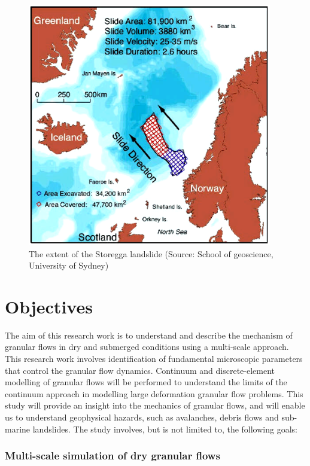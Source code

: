 \begin{figure}[htpb]
\centering
\includegraphics[width=0.95\textwidth]{Storegga}
\caption[The extent of the Storegga landslide]{The extent of the Storegga 
landslide (Source: School of geoscience, University of Sydney)}
\label{fig:Landslide}
\end{figure}

\section{Objectives}
The aim of this research work is to understand and describe the mechanism of 
granular flows in dry and submerged conditions using a multi-scale approach. 
This research work involves identification of fundamental microscopic 
parameters that control the granular flow dynamics. Continuum and 
discrete-element modelling of granular flows will be performed to understand 
the limits of the continuum approach in modelling large deformation granular 
flow problems. This study will provide an insight into the mechanics of 
granular flows, and will enable us to understand geophysical hazards, such as 
avalanches, debris flows and sub-marine landslides. The study involves, but is 
not limited to, the following goals:

\tochide\subsubsection{Multi-scale simulation of dry granular flows}

